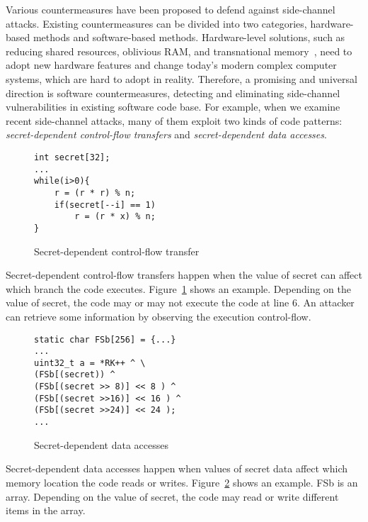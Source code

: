 Various countermeasures have been proposed to defend against side-channel attacks. Existing countermeasures can be divided into two categories, hardware-based methods and software-based methods. Hardware-level solutions, such as reducing shared resources, oblivious RAM, and transnational memory~\cite{203878,217537,shih2017t,Zhang:2015:HDL:2775054.2694372}, need to adopt new hardware features and change  today's modern complex computer systems, which are hard to adopt in reality. Therefore, a promising and universal direction is software countermeasures, detecting and eliminating side-channel vulnerabilities in existing software code base. For example, when we examine recent side-channel attacks, many of them exploit two kinds of code patterns: \emph{secret-dependent control-flow transfers} and \emph{secret-dependent data accesses}.
\begin{figure}[h]
    \begin{lstlisting}[xleftmargin=.32\textwidth, xrightmargin=.32\textwidth]
int secret[32];
...
while(i>0){
    r = (r * r) % n;
    if(secret[--i] == 1)
        r = (r * x) % n;   
}
\end{lstlisting}
    \caption{Secret-dependent control-flow transfer}
    \label{fig:secret:cf}
\end{figure}

Secret-dependent control-flow transfers happen when the value of secret can affect which branch the code executes. Figure~\ref{fig:secret:cf} shows an example. Depending on the value of \textsf{secret}, the code may or may not execute the code at line 6. An attacker can retrieve some information by observing the execution control-flow.

\begin{figure}[h]
    \begin{lstlisting}[xleftmargin=.32\textwidth, xrightmargin=.32\textwidth]
static char FSb[256] = {...}
... 
uint32_t a = *RK++ ^ \ 
(FSb[(secret)) ^
(FSb[(secret >> 8)] << 8 ) ^
(FSb[(secret >>16)] << 16 ) ^
(FSb[(secret >>24)] << 24 );
...
\end{lstlisting}
    \caption{Secret-dependent data accesses}
    \label{fig:secret:da}
\end{figure}

Secret-dependent data accesses happen when values of secret data affect which memory location the code reads or writes. Figure~\ref{fig:secret:da} shows an example. \textsf{FSb} is an array. Depending on the value of \textsf{secret}, the code may read or write different items in the array.

